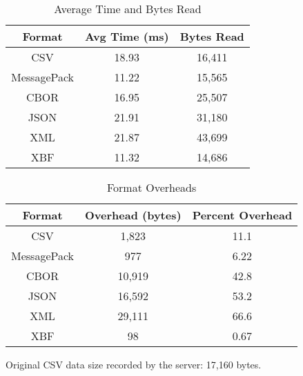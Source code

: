 \documentclass[conference]{IEEEtran}
\begin{document}
\begin{table}[htbp]
	\caption{Average Time and Bytes Read}
	\begin{center}
		\begin{tabular}{|c|c|c|}
			\hline
			\textbf{Format} & \textbf{Avg Time (ms)} & \textbf{Bytes Read} \\
			\hline
			CSV             & 18.93                  & 16,411              \\
			MessagePack     & 11.22                  & 15,565              \\
			CBOR            & 16.95                  & 25,507              \\
			JSON            & 21.91                  & 31,180              \\
			XML             & 21.87                  & 43,699              \\
			XBF             & 11.32                  & 14,686              \\
			\hline
		\end{tabular}
	\end{center}\label{time_and_bytes}
\end{table}

\begin{table}[htbp]
	\caption{Format Overheads}
	\begin{center}
		\begin{tabular}{|c|c|c|}
			\hline
			\textbf{Format} & \textbf{Overhead (bytes)} & \textbf{Percent Overhead} \\
			\hline
			CSV             & 1,823                     & 11.1                      \\
			MessagePack     & 977                       & 6.22                      \\
			CBOR            & 10,919                    & 42.8                      \\
			JSON            & 16,592                    & 53.2                      \\
			XML             & 29,111                    & 66.6                      \\
			XBF             & 98                        & 0.67                      \\
			\hline
		\end{tabular}
	\end{center}\label{overhead}
\end{table}

Original CSV data size recorded by the server: 17,160 bytes.
\end{document}
